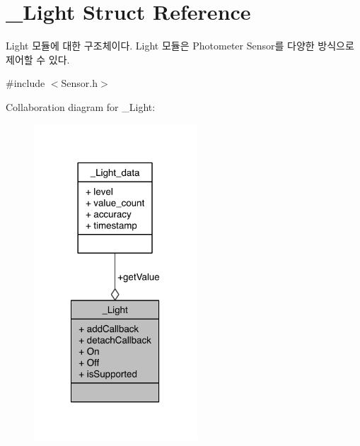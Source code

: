 \hypertarget{struct__Light}{\section{\-\_\-\-Light Struct Reference}
\label{struct__Light}
}


Light 모듈에 대한 구조체이다. Light 모듈은 Photometer Sensor를 다양한 방식으로 제어할 수 있다.  




{\ttfamily \#include $<$Sensor.\-h$>$}



Collaboration diagram for \-\_\-\-Light\-:\nopagebreak
\begin{figure}[H]
\begin{center}
\leavevmode
\includegraphics[width=173pt]{d3/d8b/struct__Light__coll__graph}
\end{center}
\end{figure}
